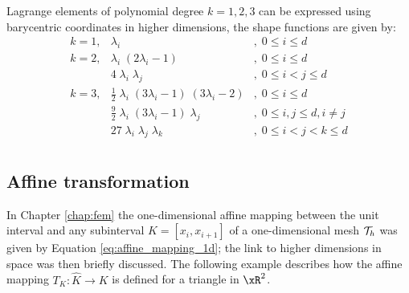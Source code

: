 Lagrange elements of polynomial degree $k=1,2,3$ can be expressed using barycentric coordinates in higher dimensions, the shape functions are given by:
\begin{equation*}
\begin{array}{lll}
k = 1, & \displaystyle\lambda_i &,\;0 \leq i \leq d\\[4ex]
k = 2, & \displaystyle\lambda_i\;(2 \lambda_i - 1) & ,\;0 \leq i \leq d\\[2ex]
       & \displaystyle4\;\lambda_i\;\lambda_j       & ,\;0 \leq i < j \leq d\\[4ex]
k = 3, & \displaystyle\frac{1}{2}\;\lambda_i\;(3\lambda_i - 1)\;(3 \lambda_i - 2) & ,\;0 \leq i \leq d\\[2ex]
       & \displaystyle\frac{9}{2}\;\lambda_i\;(3\lambda_i - 1)\;\lambda_j & ,\;0 \leq i,j \leq d, i \neq j\\[2ex]
       & \displaystyle27\;\lambda_i\;\lambda_j\;\lambda_k & ,\;0 \leq i < j < k \leq d\\
\end{array}
\end{equation*}

\subsection{Affine transformation}

In Chapter \ref{chap:fem} the one-dimensional affine mapping between the unit interval and any subinterval $K = [x_{i}, x_{i+1}]$ of a one-dimensional mesh ${\mathcal T}_h$ was given by Equation \eqref{eq:affine_mapping_1d}; the link to higher dimensions in space was then briefly discussed.
The following example describes how the affine mapping $T_K : \hat K \rightarrow K$ is defined for a triangle in $\xR^2$.

\begin{figure}[h!]\label{fig:affine_mapping_2d}
\centering
{}
\end{figure}

